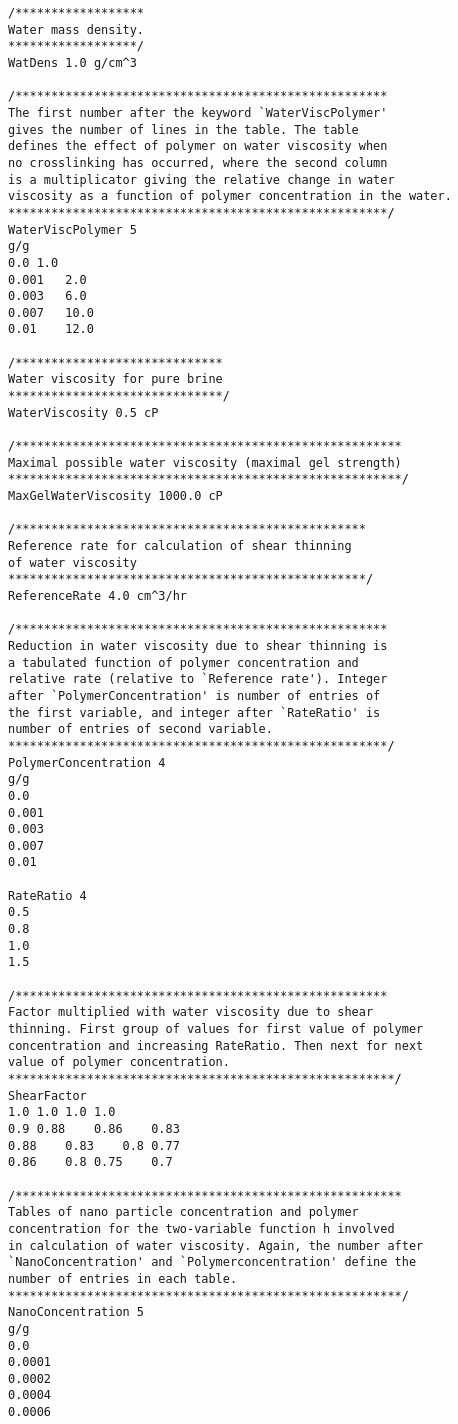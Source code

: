 \begin{appendices}
\begin{lstlisting}
/******************
Water mass density.
******************/
WatDens 1.0 g/cm^3

/****************************************************
The first number after the keyword `WaterViscPolymer'
gives the number of lines in the table. The table 
defines the effect of polymer on water viscosity when 
no crosslinking has occurred, where the second column
is a multiplicator giving the relative change in water 
viscosity as a function of polymer concentration in the water. 
*****************************************************/
WaterViscPolymer 5
g/g    
0.0	1.0  
0.001  	2.0
0.003  	6.0
0.007  	10.0
0.01   	12.0

/*****************************
Water viscosity for pure brine
******************************/
WaterViscosity 0.5 cP

/******************************************************
Maximal possible water viscosity (maximal gel strength) 
*******************************************************/
MaxGelWaterViscosity 1000.0 cP

/*************************************************
Reference rate for calculation of shear thinning 
of water viscosity
**************************************************/ 
ReferenceRate 4.0 cm^3/hr

/****************************************************
Reduction in water viscosity due to shear thinning is
a tabulated function of polymer concentration and 
relative rate (relative to `Reference rate'). Integer
after `PolymerConcentration' is number of entries of 
the first variable, and integer after `RateRatio' is
number of entries of second variable.
*****************************************************/
PolymerConcentration 4
g/g
0.0    
0.001  
0.003  
0.007  
0.01   

RateRatio 4
0.5
0.8
1.0
1.5

/****************************************************
Factor multiplied with water viscosity due to shear 
thinning. First group of values for first value of polymer
concentration and increasing RateRatio. Then next for next
value of polymer concentration.
******************************************************/
ShearFactor
1.0	1.0	1.0	1.0	
0.9	0.88	0.86	0.83
0.88	0.83	0.8	0.77
0.86	0.8	0.75	0.7

/******************************************************
Tables of nano particle concentration and polymer 
concentration for the two-variable function h involved 
in calculation of water viscosity. Again, the number after
`NanoConcentration' and `Polymerconcentration' define the
number of entries in each table.
*******************************************************/ 
NanoConcentration 5
g/g  
0.0 
0.0001
0.0002
0.0004
0.0006


\end{lstlisting}
\end{appendices}
